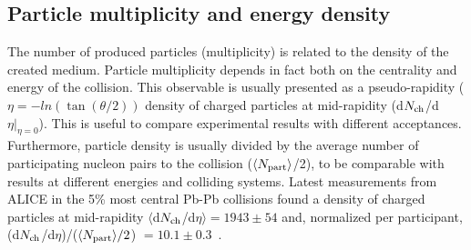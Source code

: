 \subsection{Particle multiplicity and energy density}
The number of produced particles (multiplicity) is related to the density of the created medium. Particle multiplicity depends in fact both on the centrality and energy of the collision. This observable is usually presented as a pseudo-rapidity ($\eta = - ln(\tan(\theta/2))$ density of charged particles at mid-rapidity (d$N_{\rm ch}$/d$\eta |_{\eta=0}$). This is useful to compare experimental results with different acceptances. Furthermore, particle density is usually divided by the average number of participating nucleon pairs to the collision ($\langle N_{\rm part}\rangle$/2), to be comparable with results at different energies and colliding systems. Latest measurements from ALICE in the 5\% most central Pb-Pb collisions found a density of charged particles at mid-rapidity $\langle $d$N_{\rm ch}$/d$\eta \rangle = 1943 \pm 54$ and, normalized per participant, (d$N_{\rm ch}$/d$\eta$)/($\langle N_{\rm part} \rangle/2$) $ = 10.1 \pm 0.3$~\cite{Adam:2015ptt}.  

